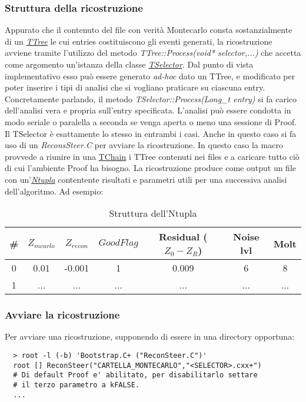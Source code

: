 \documentclass{article}
\begin{document}
\subsubsection{Struttura della ricostruzione}
Appurato che il contenuto del file con verità Montecarlo consta sostanzialmente di un
\textit{\href{http://root.cern.ch/root/html/TTree.html}{TTree}} 
le cui entries costituiscono gli eventi generati, la ricostruzione avviene tramite l'utilizzo del metodo \textit{TTree::Process(void* selector,...)} che accetta come argomento un'istanza della classe \textit{\href{http://root.cern.ch/root/html/TSelector.html}{TSelector}}.
Dal punto di vista implementativo esso può essere generato \textit{ad-hoc} dato un TTree, e modificato per poter inserire i tipi di analisi che si vogliano praticare su ciascuna entry.
Concretamente parlando, il metodo \textit{TSelector::Process(Long\_t entry)} si fa carico dell'analisi vera e propria sull'entry specificata.
L'analisi può essere condotta in modo seriale o paralella a seconda se venga aperta o meno una sessione di Proof. Il TSelector è esattamente lo stesso in entrambi i casi.
Anche in questo caso si fa uso di un \textit{ReconsSteer.C} per avviare la ricostruzione. In questo caso la macro provvede a riunire in una \href{http://root.cern.ch/root/html/TChain.html}{TChain} i TTree contenuti nei files e a caricare tutto ciò di cui l'ambiente Proof ha bisogno.
La ricostruzione produce come output un file con un'\textit{\href{http://root.cern.ch/root/html/TNtuple.html}{Ntupla}} contentente risultati e parametri utili per una successiva analisi dell'algoritmo.
Ad esempio:\\
\begin{table}[h]
   \begin{tabular}{ c || c | c | c | c | c | c }
      \hline
      \# & $Z_{mcarlo}$ & $Z_{recon}$ & $GoodFlag$ & Residual ($Z_0-Z_R$) & Noise lvl & Molt\\
      \hline
      0 & 0.01 & -0.001 & 1 & 0.009 & 6 & 8 \\
      \hline
      1 & ... & ... & ... & ... & ... & ... \\ 
      \hline 
   \end{tabular}
   \caption{Struttura dell'Ntupla}
\end{table}
\subsubsection{Avviare la ricostruzione}
\noindent Per avviare una ricostruzione, supponendo di essere in una directory opportuna:
\begin{verbatim}
  > root -l (-b) 'Bootstrap.C+ ("ReconSteer.C")'
  root [] ReconSteer("CARTELLA_MONTECARLO","<SELECTOR>.cxx+")
  # Di default Proof e' abilitato, per disabilitarlo settare 
  # il terzo parametro a kFALSE.
  ...
\end{verbatim}
\newpage
\end{document}
